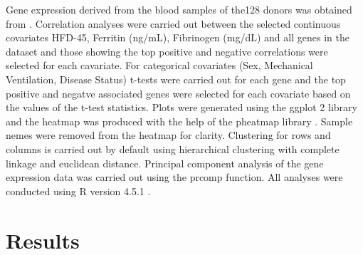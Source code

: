 \documentclass[11pt,a4paper]{article}
\begin{document}
Gene expression derived from the blood samples of the128 donors was obtained from \cite{Ref1}. Correlation analyses were carried out between the selected continuous covariates HFD-45, Ferritin (ng/mL),  Fibrinogen (mg/dL) and all genes in the dataset and those showing the top positive and negative correlations were selected for each cavariate. For categorical covariates (Sex, Mechanical Ventilation, Disease Status) t-tests were carried out for each gene and the top positive and negatve associated genes were selected for each covariate based on the values of the t-test statistics. Plots were generated using the ggplot 2 library \cite{Ref3} and the heatmap was produced with the help of the pheatmap library \cite{Ref4}. Sample nemes were removed from the heatmap for clarity. Clustering for rows and columns is carried out by default using hierarchical clustering with complete linkage and euclidean distance. Principal component analysis of the gene expression data was carried out using the prcomp function. All analyses were conducted using R version 4.5.1 \cite{Ref5}.

\section{Results}
\end{document}
